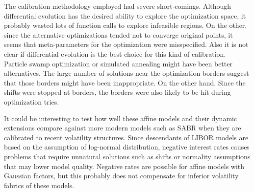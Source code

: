 The calibration methodology employed had severe short-comings. Although differential evolution has the desired ability to explore the optimization space, it probably wasted lots of function calls to explore infeasible regions. On the other, since the alternative optimizations tended not to converge original points, it seems that meta-parameters for the optimization were misspecified. Also it is not clear if differential evolution is the best choice for this kind of calibration. Particle swamp optimization or simulated annealing might have been better alternatives. The large number of solutions near the optimization borders suggest that those borders might have been inappropriate. On the other hand. Since the shifts were stopped at borders, the borders were also likely to be hit during optimization tries.

It could be interesting to test how well these affine models and their dynamic extensions compare against more modern models such as SABR when they are calibrated to recent volatility structures. Since descendants of LIBOR models are based on the assumption of log-normal distribution, negative interest rates causes problems that require unnatural solutions such as shifts or normality assumptions that may lower model quality. Negative rates are possible for affine models with Gaussian factors, but this probably does not compensate for inferior volatility fabrics of these models.

